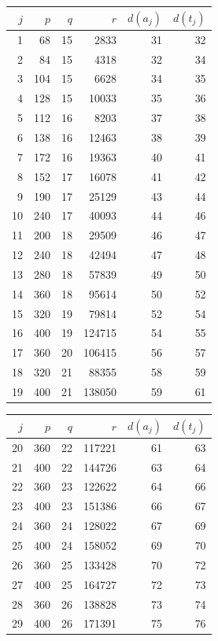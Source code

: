 \documentclass[11pt,a4paper]{article}
\theoremstyle{definition}
\theoremstyle{remark}
\begin{document}
\begin{center}\scriptsize
\begin{tabular}{@{}rrrrrr@{}}
\toprule
$j$ & $p$ & $q$ & $r$ & $d(a_j)$ & $d(t_j)$ \\
\midrule
1 & 68 & 15 & 2833 & 31 & 32 \\
2 & 84 & 15 & 4318 & 32 & 34 \\
3 & 104 & 15 & 6628 & 34 & 35 \\
4 & 128 & 15 & 10033 & 35 & 36 \\
5 & 112 & 16 & 8203 & 37 & 38 \\
6 & 138 & 16 & 12463 & 38 & 39 \\
7 & 172 & 16 & 19363 & 40 & 41 \\
8 & 152 & 17 & 16078 & 41 & 42 \\
9 & 190 & 17 & 25129 & 43 & 44 \\
10 & 240 & 17 & 40093 & 44 & 46 \\
11 & 200 & 18 & 29509 & 46 & 47 \\
12 & 240 & 18 & 42494 & 47 & 48 \\
13 & 280 & 18 & 57839 & 49 & 50 \\
14 & 360 & 18 & 95614 & 50 & 52 \\
15 & 320 & 19 & 79814 & 52 & 54 \\
16 & 400 & 19 & 124715 & 54 & 55 \\
17 & 360 & 20 & 106415 & 56 & 57 \\
18 & 320 & 21 & 88355 & 58 & 59 \\
19 & 400 & 21 & 138050 & 59 & 61 \\
\bottomrule
\end{tabular}\hfill
\begin{tabular}{@{}rrrrrr@{}}
\toprule
$j$ & $p$ & $q$ & $r$ & $d(a_j)$ & $d(t_j)$ \\
\midrule
20 & 360 & 22 & 117221 & 61 & 63 \\
21 & 400 & 22 & 144726 & 63 & 64 \\
22 & 360 & 23 & 122622 & 64 & 66 \\
23 & 400 & 23 & 151386 & 66 & 67 \\
24 & 360 & 24 & 128022 & 67 & 69 \\
25 & 400 & 24 & 158052 & 69 & 70 \\
26 & 360 & 25 & 133428 & 70 & 72 \\
27 & 400 & 25 & 164727 & 72 & 73 \\
28 & 360 & 26 & 138828 & 73 & 74 \\
29 & 400 & 26 & 171391 & 75 & 76 \\

\end{tabular}
\end{center}
\end{document}
